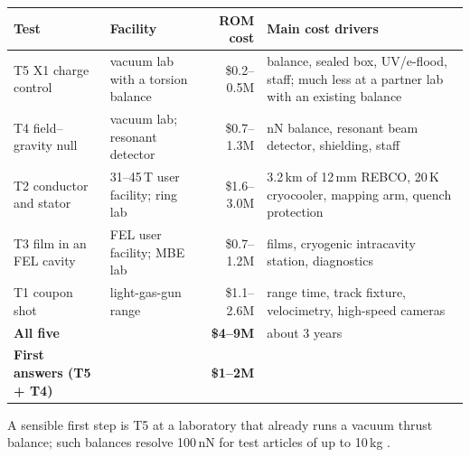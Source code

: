 \documentclass[10.5pt,a4paper]{article}
\begin{document}
\begin{center}\small
{}
\begin{tabularx}{\textwidth}{@{}l l r X@{}}
\toprule
\textbf{Test} & \textbf{Facility} & \textbf{ROM cost} & \textbf{Main cost drivers}\\
\midrule
T5 X1 charge control & vacuum lab with a torsion balance & \$0.2--0.5M & balance, sealed box, UV/e-flood, staff; much less at a partner lab with an existing balance\\
T4 field--gravity null & vacuum lab; resonant detector & \$0.7--1.3M & nN balance, resonant beam detector, shielding, staff\\
T2 conductor and stator & 31--45\,T user facility; ring lab & \$1.6--3.0M & 3.2\,km of 12\,mm REBCO, 20\,K cryocooler, mapping arm, quench protection\\
T3 film in an FEL cavity & FEL user facility; MBE lab & \$0.7--1.2M & films, cryogenic intracavity station, diagnostics\\
T1 coupon shot & light-gas-gun range & \$1.1--2.6M & range time, track fixture, velocimetry, high-speed cameras\\
\midrule
\textbf{All five} & & \textbf{\$4--9M} & about 3 years\\
\textbf{First answers (T5 + T4)} & & \textbf{\$1--2M} & \\
\bottomrule
\end{tabularx}
\end{center}
A sensible first step is T5 at a laboratory that already runs a vacuum thrust balance; such balances resolve 100\,nN for test articles of up to 10\,kg \cite{tajmar18}.
\end{document}
